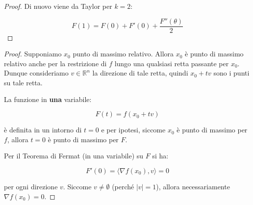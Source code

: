 \documentclass[11pt]{article}
\begin{document}
\newpage
\begin{proof}
       Di nuovo viene da Taylor per $k=2$:

       \[
           F(1) = F(0) + F'(0) + \frac{F''(\theta)}{2}
       \]
\end{proof}
\newpage
{}
\begin{proof}
    Supponiamo $x_0$ punto di massimo relativo. Allora $x_0$ è punto di massimo relativo anche per la restrizione di $f$ lungo una qualsiasi retta passante per $x_0$. Dunque consideriamo $v \in \mathbb{R}^{n}$ la direzione di tale retta, quindi $x_0 + tv$ sono i punti su tale retta.

    La funzione in \textbf{una} variabile:

        \[
        F(t) = f(x_0 + tv)
    \] 

    è definita in un intorno di $t=0$ e per ipotesi, siccome $x_0$ è punto di massimo per $f$, allora $t=0$ è punto di massimo per $F$.

    Per il Teorema di Fermat (in una variabile) su $F$ si ha:

    \[
        F'(0) = \langle \nabla f(x_0),v \rangle = 0
    \]

    per ogni direzione $v$. Siccome $v \neq \emptyset$ (perché $|v| = 1$), allora necessariamente $\nabla f(x_0) = 0$.

\end{proof}
\newpage
\end{document}
